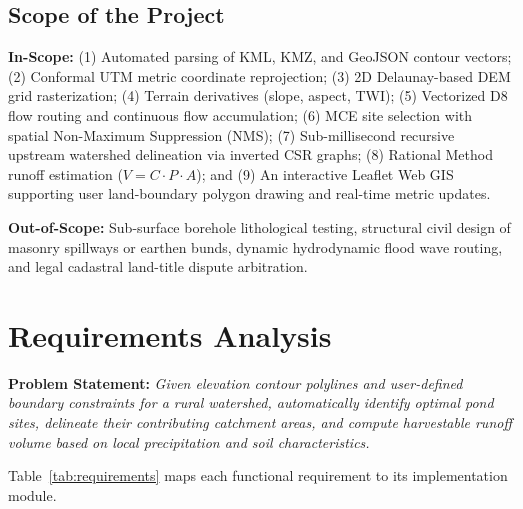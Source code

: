 \documentclass[manuscript,screen,review]{acmart}
\begin{document}
\subsection{Scope of the Project}
\textbf{In-Scope:} (1) Automated parsing of KML, KMZ, and GeoJSON contour vectors; (2) Conformal UTM metric coordinate reprojection; (3) 2D Delaunay-based DEM grid rasterization; (4) Terrain derivatives (slope, aspect, TWI); (5) Vectorized D8 flow routing and continuous flow accumulation; (6) MCE site selection with spatial Non-Maximum Suppression (NMS); (7) Sub-millisecond recursive upstream watershed delineation via inverted CSR graphs; (8) Rational Method runoff estimation ($V = C \cdot P \cdot A$); and (9) An interactive Leaflet Web GIS supporting user land-boundary polygon drawing and real-time metric updates.

\textbf{Out-of-Scope:} Sub-surface borehole lithological testing, structural civil design of masonry spillways or earthen bunds, dynamic hydrodynamic flood wave routing, and legal cadastral land-title dispute arbitration.

\section{Requirements Analysis}
\label{sec:requirements}
\textbf{Problem Statement:} \emph{Given elevation contour polylines and user-defined boundary constraints for a rural watershed, automatically identify optimal pond sites, delineate their contributing catchment areas, and compute harvestable runoff volume based on local precipitation and soil characteristics.}

Table~\ref{tab:requirements} maps each functional requirement to its implementation module.
\end{document}
